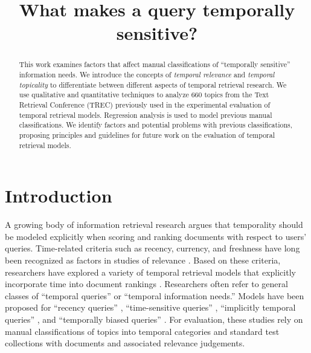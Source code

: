\documentclass{sig-alternate}
\begin{document}
\author{}


\title{What makes a query temporally sensitive?}

\maketitle


\begin{abstract}

This work examines factors that affect manual classifications of ``temporally sensitive'' information needs.  We introduce the concepts of \emph{temporal relevance} and \emph{temporal topicality} to differentiate between different aspects of temporal retrieval research. We use qualitative and quantitative techniques to analyze 660 topics from the Text Retrieval Conference (TREC) previously used in the experimental evaluation of temporal retrieval models.  Regression analysis is used to model previous manual classifications. We identify factors and potential problems with previous classifications, proposing principles and guidelines for future work on the evaluation of temporal retrieval models. 

\end{abstract}


\section{Introduction}

A growing body of information retrieval research argues that temporality should be modeled explicitly when scoring and ranking documents with respect to users' queries. Time-related criteria such as recency, currency, and freshness have long been recognized as factors in studies of relevance \cite{Barry1998, Mizzaro1997, Dai2010, Dong2010}. Based on these criteria, researchers have explored a variety of temporal retrieval models that explicitly incorporate time into document rankings \cite{Li2003,Efron2011,Dakka2012,Kanhabua2011,Kanhabua2012a,Peetz2013a}. Researchers often refer to general classes of ``temporal queries'' or ``temporal information needs.''  Models have been proposed for ``recency queries'' \cite{Li2003,Efron2011}, ``time-sensitive queries'' \cite{Dakka2012}, ``implicitly temporal queries'' \cite{Metzler2009}, and ``temporally biased queries'' \cite{Jones2007}.  For evaluation,  these studies rely on manual classifications of topics into temporal categories and standard test collections with documents and associated relevance judgements.
\end{document}
